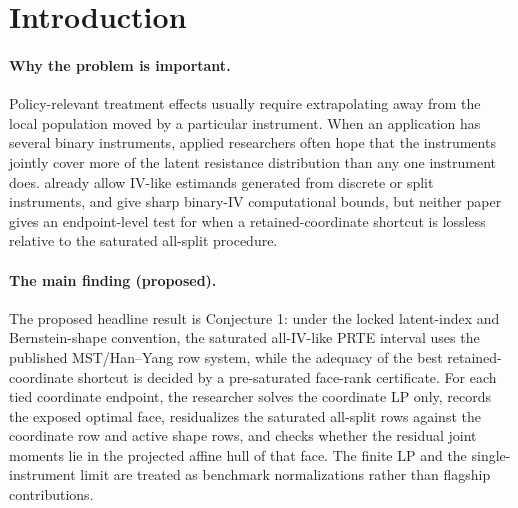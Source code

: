 \documentclass[11pt]{article}
\theoremstyle{definition}
\theoremstyle{plain}
\theoremstyle{remark}
\begin{document}
\begin{abstract}
This proposal asks for an endpoint-level adequacy certificate for a common
multi-instrument shortcut: using the best retained binary coordinate instead
of the saturated all-IV-like MTE/PRTE bound already permitted by
\citet{MogstadSantosTorgovitsky2018} and sharpened computationally by
\citet{HanYang2024}.  The finite-dimensional LP itself is published
machinery, not the novelty claim.  The novel kernel is the conjectured
frontier theorem: before solving the saturated endpoint, one can solve only
the tied coordinate endpoint LPs and then apply a rank/projection test to the
residual all-split moment rows on their optimal faces.  Strict improvement
occurs exactly when every tied coordinate-optimal face fails this residual
moment test, and the resulting endpoint gain is represented by a residual
face-restricted dual program rather than by a generic restatement of nested LP
endpoints.  Resolving this would turn MST's split-instrument examples and the
recent binary-IV LP literature into a checkable diagnostic for when a multi-IV
design adds policy-relevant information beyond coordinate-wise single-IV
reporting.
\end{abstract}

\section{Introduction}
\paragraph{Why the problem is important.}
Policy-relevant treatment effects usually require extrapolating away from the
local population moved by a particular instrument.  When an application has
several binary instruments, applied researchers often hope that the instruments
jointly cover more of the latent resistance distribution than any one
instrument does.  \citet{MogstadSantosTorgovitsky2018} already allow
IV-like estimands generated from discrete or split instruments, and
\citet{HanYang2024} give sharp binary-IV computational bounds, but neither
paper gives an endpoint-level test for when a retained-coordinate shortcut is
lossless relative to the saturated all-split procedure.

\paragraph{The main finding (proposed).}
The proposed headline result is Conjecture 1: under the locked latent-index and
Bernstein-shape convention, the saturated all-IV-like PRTE interval uses the
published MST/Han--Yang row system, while the adequacy of the best
retained-coordinate shortcut is decided by a pre-saturated face-rank
certificate.  For each tied coordinate endpoint, the researcher solves the
coordinate LP only, records the exposed optimal face, residualizes the
saturated all-split rows against the coordinate row and active shape rows, and
checks whether the residual joint moments lie in the projected affine hull of
that face.  The finite LP and the single-instrument limit are treated as
benchmark normalizations rather than flagship contributions.
\end{document}
